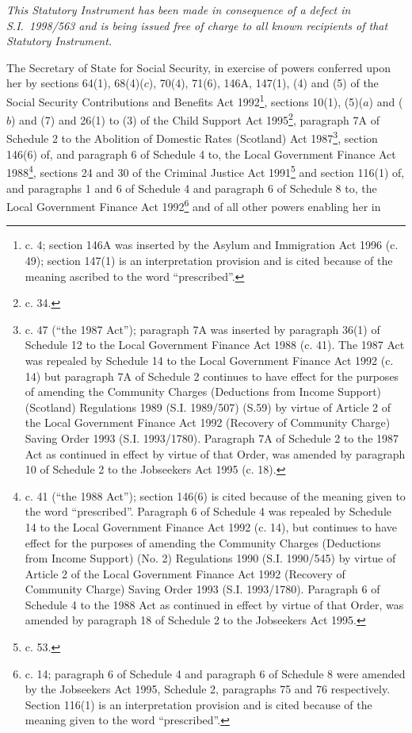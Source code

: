 \documentclass[12pt,a4paper]{article}
\title{\regstitle}
\author{S.I. 1998 No. 865}
\date{Made 19th March 1998\\Laid before Parliament 19th March 1998\\Coming into force 20th March 1998
}
\begin{document}
\maketitle

\begin{center}
\itshape This Statutory Instrument has been made in consequence of a defect in S.I.\ 1998/563 and is being issued free of charge to all known recipients of that Statutory Instrument. 
\end{center}

\noindent
The Secretary of State for Social Security, in exercise of powers conferred upon her by sections 64(1), 68(4)($c$), 70(4), 71(6), 146A, 147(1), (4) and (5) of the Social Security Contributions and Benefits Act 1992\footnote{ c. 4; section 146A was inserted by the Asylum and Immigration Act 1996 (c. 49); section 147(1) is an interpretation provision and is cited because of the meaning ascribed to the word “prescribed”.}, sections 10(1), (5)($a$)  and ($b$)  and (7) and 26(1) to (3) of the Child Support Act 1995\footnote{ c. 34.}, paragraph 7A of Schedule 2 to the Abolition of Domestic Rates (Scotland) Act 1987\footnote{ c. 47 (“the 1987 Act”); paragraph 7A was inserted by paragraph 36(1) of Schedule 12 to the Local Government Finance Act 1988 (c. 41). The 1987 Act was repealed by Schedule 14 to the Local Government Finance Act 1992 (c. 14) but paragraph 7A of Schedule 2 continues to have effect for the purposes of amending the Community Charges (Deductions from Income Support) (Scotland) Regulations 1989 (S.I. 1989/507) (S.59) by virtue of Article 2 of the Local Government Finance Act 1992 (Recovery of Community Charge) Saving Order 1993 (S.I. 1993/1780). Paragraph 7A of Schedule 2 to the 1987 Act as continued in effect by virtue of that Order, was amended by paragraph 10 of Schedule 2 to the Jobseekers Act 1995 (c. 18).}, section 146(6) of, and paragraph 6 of Schedule 4 to, the Local Government Finance Act 1988\footnote{ c. 41 (“the 1988 Act”); section 146(6) is cited because of the meaning given to the word “prescribed”. Paragraph 6 of Schedule 4 was repealed by Schedule 14 to the Local Government Finance Act 1992 (c. 14), but continues to have effect for the purposes of amending the Community Charges (Deductions from Income Support) (No. 2) Regulations 1990 (S.I. 1990/545) by virtue of Article 2 of the Local Government Finance Act 1992 (Recovery of Community Charge) Saving Order 1993 (S.I. 1993/1780). Paragraph 6 of Schedule 4 to the 1988 Act as continued in effect by virtue of that Order, was amended by paragraph 18 of Schedule 2 to the Jobseekers Act 1995.}, sections 24 and 30 of the Criminal Justice Act 1991\footnote{ c. 53.} and section 116(1) of, and paragraphs 1 and 6 of Schedule 4 and paragraph 6 of Schedule 8 to, the Local Government Finance Act 1992\footnote{ c. 14; paragraph 6 of Schedule 4 and paragraph 6 of Schedule 8 were amended by the Jobseekers Act 1995, Schedule 2, paragraphs 75 and 76 respectively. Section 116(1) is an interpretation provision and is cited because of the meaning given to the word “prescribed”.} and of all other powers enabling her in 
\end{document}
